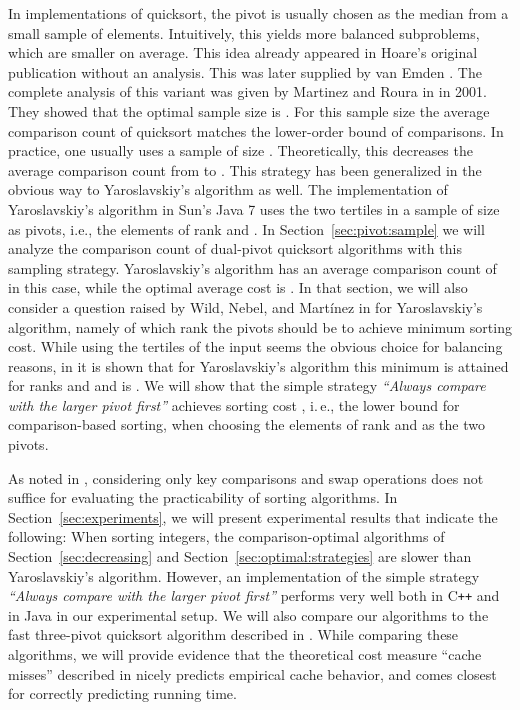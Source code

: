 \documentclass[prodmode,acmtalg]{acmsmall}
\newcommand{\Cpp}{C{}\texttt{++}{}}
\begin{document}
In implementations of quicksort, the pivot is usually chosen as the median 
from a small sample of  elements. Intuitively, this yields more balanced subproblems, 
which are smaller on average.
This idea already appeared in Hoare's original publication \cite{Hoare} without 
an analysis. This was later supplied by van Emden \cite{vanEmden}. The complete analysis of
this variant was given by Martinez and Roura in \cite{MartinezR01} in 2001. 
They showed that the optimal sample size is . For this
sample size the 
average comparison count of quicksort
matches the lower-order bound of  comparisons. 
In practice, one usually uses a sample of size . Theoretically, this decreases
the average comparison count from  to .
This strategy has been generalized in the obvious way to Yaroslavskiy's
algorithm as well. The implementation of Yaroslavskiy's algorithm in Sun's Java 7 uses
the two tertiles in a sample of size  as pivots, i.e., the elements of rank  and .
In
Section~\ref{sec:pivot:sample} we will analyze the comparison count of dual-pivot
quicksort algorithms with this sampling strategy. 
Yaroslavskiy's algorithm has an average comparison count of  
in this case, while the optimal average cost is .
In that section, we will also consider a question raised by Wild, Nebel, and Mart\'inez
in \cite[Section 8]{WildNM14} for Yaroslavskiy's algorithm, namely of which rank the
pivots should be to achieve  minimum sorting cost. While using
the tertiles of the input 
seems the obvious choice for balancing reasons, in \cite{WildNM14} it is shown
that for Yaroslavskiy's algorithm this minimum is attained for ranks
 and  and is . We will show that the simple strategy \emph{``Always
  compare with the larger pivot first''} achieves sorting cost ,
  i.\,e., the lower bound for comparison-based sorting,  when choosing the
  elements of rank  and  as the two pivots.

As noted in \cite{nebel13}, considering only key comparisons
and swap operations does not suffice for evaluating the practicability of
sorting algorithms. In Section~\ref{sec:experiments}, we will present
experimental results that indicate the following: When sorting integers, the
comparison-optimal algorithms of Section~\ref{sec:decreasing} and
Section~\ref{sec:optimal:strategies} are slower than Yaroslavskiy's
algorithm. However, an implementation of the simple strategy \emph{``Always compare
with the larger pivot first''} performs very well both in {\Cpp} and in Java in
our experimental setup.  We will also compare our algorithms to the fast
three-pivot quicksort algorithm described in \cite{Kushagra14}.
While comparing these algorithms, we will provide evidence that the theoretical cost measure ``cache misses'' 
described in \cite{Kushagra14} nicely predicts empirical cache behavior,
and comes closest for correctly predicting running time.
\end{document}
